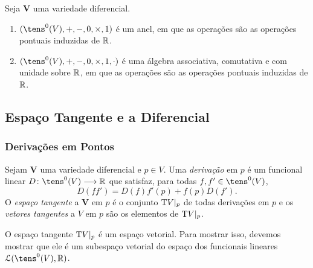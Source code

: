\begin{prop}
Seja $\bm V$ uma variedade diferencial.
	\begin{enumerate}
	\item $(\tens^0(V),+,-,0,\times,1)$ é um anel, em que as operações são as operações pontuais induzidas de $\mathbb{R}$.
	\item $(\tens^0(V),+,-,0,\times,1,\cdot)$ é uma álgebra associativa, comutativa e com unidade sobre $\mathbb{R}$, em que as operações são as operações pontuais induzidas de $\mathbb{R}$.
	\end{enumerate}
\end{prop}

\subsection{Espaço Tangente e a Diferencial}

\subsubsection{Derivações em Pontos}

\begin{defi}
Sejam $\bm V$ uma variedade diferencial e $p \in V$. Uma \emph{derivação} em $p$ é um funcional linear $D\colon \tens^0(V) \to \R$ que satisfaz, para todas $f,f' \in \tens^0(V)$,
	\begin{equation*}
	D(ff') = D(f)f'(p) + f(p)D(f').
	\end{equation*}
O \emph{espaço tangente} a $\bm V$ em $p$ é o conjunto $\mathrm{T} V|_p$ de todas derivações em $p$ e os \emph{vetores tangentes} a $V$ em $p$ são os elementos de $\mathrm{T} V|_p$.
\end{defi}

O espaço tangente $\mathrm{T} V|_p$ é um espaço vetorial. Para mostrar isso, devemos mostrar que ele é um subespaço vetorial do espaço dos funcionais lineares $\lin(\tens^0(V),\R)$.

